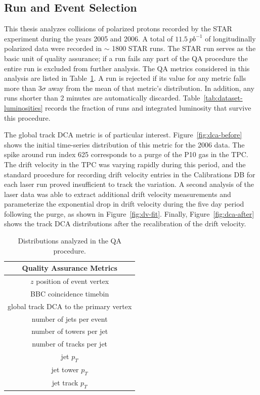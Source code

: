 
\subsection{Run and Event Selection}

This thesis analyzes collisions of polarized protons recorded by the STAR
experiment during the years 2005 and 2006. A total of \(11.5~pb^{-1}\) of
longitudinally polarized data were recorded in $\sim$ 1800 STAR runs. The STAR
run serves as the basic unit of quality assurance; if a run fails any part of
the QA procedure the entire run is excluded from further analysis. The QA
metrics considered in this analysis are listed in Table~\ref{tab:qa-metrics}. A
run is rejected if its value for any metric falls more than 3$\sigma$ away from
the mean of that metric's distribution. In addition, any runs shorter than 2
minutes are automatically discarded. Table~\ref{tab:dataset-luminosities}
records the fraction of runs and integrated luminosity that survive this
procedure.

The global track DCA metric is of particular interest.
Figure~\ref{fig:dca-before} shows the initial time-series distribution of this
metric for the 2006 data. The spike around run index 625 corresponds to a purge
of the P10 gas in the TPC. The drift velocity in the TPC was varying rapidly
during this period, and the standard procedure for recording drift velocity
entries in the Calibrations DB for each laser run proved insufficient to track
the variation. A second analysis of the laser data was able to extract
additional drift velocity measurements and parameterize the exponential drop in
drift velocity during the five day period following the purge, as shown in
Figure~\ref{fig:dv-fit}. Finally, Figure~\ref{fig:dca-after} shows the track DCA
distributions after the recalibration of the drift velocity.

\begin{table}
  \centering
  \begin{tabular}{|c|}
    \hline
    Quality Assurance Metrics \\
    \hline
    $z$ position of event vertex \\
    BBC coincidence timebin \\
    global track DCA to the primary vertex \\
    number of jets per event \\
    number of towers per jet \\
    number of tracks per jet \\
    jet $p_T$ \\
    jet tower $p_T$ \\
    jet track $p_T$ \\
    \hline
  \end{tabular}
  \caption{Distributions analyzed in the QA procedure.}
  \label{tab:qa-metrics}
\end{table}

